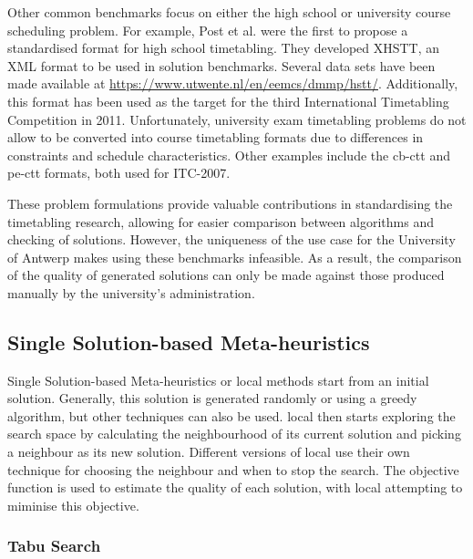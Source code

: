 Other common benchmarks focus on either the high school or university course scheduling problem. For example, Post et al. \cite{post2012} were the first to propose a standardised format for  high school timetabling. They developed XHSTT, an XML format to be used in solution benchmarks. Several data sets have been made available at \url{https://www.utwente.nl/en/eemcs/dmmp/hstt/}.
Additionally, this format has been used as the target for the third International Timetabling Competition in 2011. Unfortunately, university exam timetabling problems do not allow to be converted into course timetabling formats due to differences in constraints and schedule characteristics. Other examples include the \acrfull{cb-ctt} \cite{gaspero2007} and \acrfull{pe-ctt} \cite{lewis2007} formats, both used for ITC-2007.

These problem formulations provide valuable contributions in standardising the timetabling research, allowing for easier comparison between algorithms and checking of solutions. However, the uniqueness of the use case for the University of Antwerp makes using these benchmarks infeasible. As a result, the comparison of the quality of generated solutions can only be made against those produced manually by the university's administration.

\subsection{Single Solution-based Meta-heuristics}

Single Solution-based Meta-heuristics or \acrlong{local} methods start from an initial solution. Generally, this solution is generated randomly or using a greedy algorithm, but other techniques can also be used. \acrshort{local} then starts exploring the search space by calculating the neighbourhood of its current solution and picking a neighbour as its new solution. Different versions of \acrlong{local} use their own technique for choosing the neighbour and when to stop the search. The objective function is used to estimate the quality of each solution, with \acrshort{local} attempting to miminise this objective.
\subsubsection{Tabu Search}

